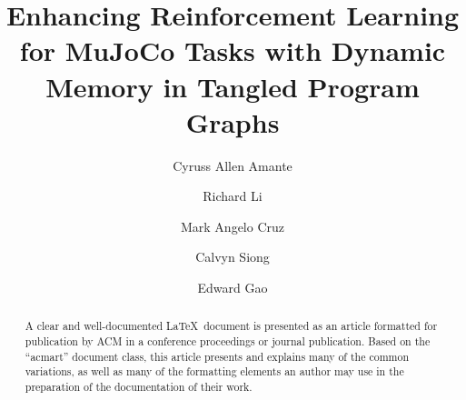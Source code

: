 \documentclass[sigconf]{acmart}
\begin{document}
\title[Dynamic Memory in Tangled Program Graphs]{Enhancing Reinforcement Learning for MuJoCo Tasks with Dynamic Memory in Tangled Program Graphs}

\author{Cyruss Allen Amante}

\author{Richard Li}

\author{Mark Angelo Cruz}

\author{Calvyn Siong}

\author{Edward Gao}


\begin{abstract}
  A clear and well-documented \LaTeX\ document is presented as an
  article formatted for publication by ACM in a conference proceedings
  or journal publication. Based on the ``acmart'' document class, this
  article presents and explains many of the common variations, as well
  as many of the formatting elements an author may use in the
  preparation of the documentation of their work.
\end{abstract}
\end{document}
